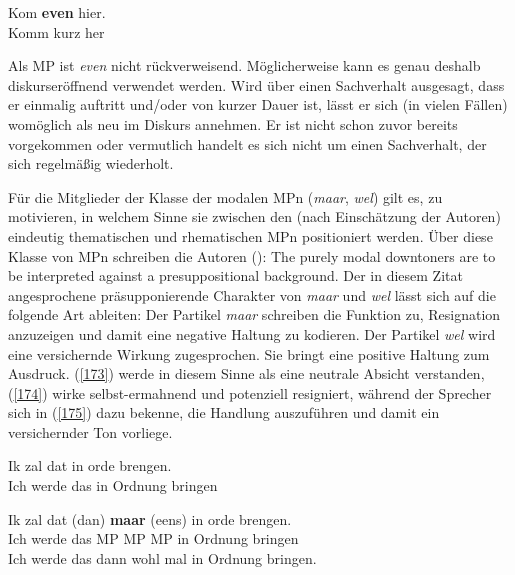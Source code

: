 \begin{exe}
	\ex\label{172} 
	\gll Kom \textbf{even} hier.\\
	 Komm kurz her\\
	 \glt
\hfill\hbox {\citet[54]{Vriendt1991}}
\end{exe}
Als MP ist \textit{even} nicht rückverweisend. Möglicherweise kann es genau deshalb diskurseröffnend verwendet werden. Wird über einen Sachverhalt ausgesagt, dass er einmalig auftritt und/oder von kurzer Dauer ist, lässt er sich (in vielen Fällen) womöglich als neu im Diskurs annehmen. Er ist nicht schon zuvor bereits vorgekommen oder vermutlich handelt es sich nicht um einen Sachverhalt, der sich regelmäßig wiederholt. 

Für die Mitglieder der Klasse der modalen MPn (\textit{maar}, \textit{wel}) gilt es, zu motivieren, in welchem Sinne sie zwischen den (nach Einschätzung der Autoren) eindeutig thematischen und rhematischen MPn positioniert werden. Über diese Klasse von MPn schreiben die Autoren (\citeyear[58]{Vriendt1991}): \glqq The purely modal downtoners are to be interpreted against a presuppositional background.\grqq{}  Der in diesem Zitat angesprochene präsupponierende  Charakter von \textit{maar} und \textit{wel} lässt sich auf die folgende Art ableiten: Der Partikel \textit{maar} schreiben \citet{Vriendt1991} die Funktion zu, Resignation anzuzeigen und damit eine negative Haltung zu kodieren. Der Partikel \textit{wel} wird eine versichernde Wirkung zugesprochen. Sie bringt eine positive Haltung zum Ausdruck. (\ref{173}) werde in diesem Sinne als eine neutrale Absicht verstanden, (\ref{174}) wirke selbst-ermahnend und potenziell resigniert, während der Sprecher sich in (\ref{175}) dazu bekenne, die Handlung auszuführen und damit ein versichernder Ton vorliege.

\begin{exe}
	\ex\label{173} 
	\gll Ik zal dat in orde brengen.\\
	 Ich werde das in Ordnung bringen \\
\end{exe}

\begin{exe}
	\ex\label{174} 
	\gll Ik zal dat (dan) \textbf{maar} (eens) in orde brengen.\\
	 Ich werde das MP MP MP in Ordnung bringen \\
	 \glt Ich werde das dann wohl mal in Ordnung bringen. 
\end{exe}

